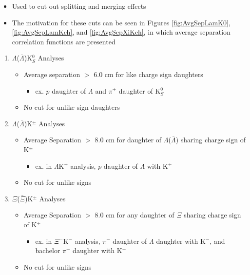 \documentclass[ALICE,manyauthors]{cernphprep}
\begin{document}
\begin{enumerate}
\begin{itemize}
  \item Used to cut out splitting and merging effects
  \item The motivation for these cuts can be seen in Figures \ref{fig:AvgSepLamK0}, \ref{fig:AvgSepLamKch}, and \ref{fig:AvgSepXiKch}, in which average separation correlation functions are presented
 \end{itemize}
 \begin{enumerate}
  \item $\Lambda$($\bar{\Lambda}$)K$^{0}_{S}$ Analyses
  \begin{itemize}
   \item Average separation $>$ 6.0 cm for like charge sign daughters
   \begin{itemize}
    \item ex. $p$ daughter of $\Lambda$ and $\pi^{+}$ daughter of K$^{0}_{S}$
   \end{itemize}
   \item No cut for unlike-sign daughters
  \end{itemize}
  \item $\Lambda$($\bar{\Lambda}$)K$^{\pm}$ Analyses
  \begin{itemize}
   \item Average Separation $>$ 8.0 cm for daughter of $\Lambda$($\bar{\Lambda}$) sharing charge sign of K$^{\pm}$
   \begin{itemize}
    \item ex. in $\Lambda$K$^{+}$ analysis, $p$ daughter of $\Lambda$ with K$^{+}$
   \end{itemize}
   \item No cut for unlike signs
  \end{itemize}
  \item $\Xi$($\bar{\Xi}$)K$^{\pm}$ Analyses
  \begin{itemize}
   \item Average Separation $>$ 8.0 cm for any daughter of $\Xi$ sharing charge sign of K$^{\pm}$
   \begin{itemize}
    \item ex. in $\Xi^{-}$K$^{-}$ analysis, $\pi^{-}$ daughter of $\Lambda$ daughter with K$^{-}$, and bachelor $\pi^{-}$ daughter with K$^{-}$
   \end{itemize}
   \item No cut for unlike signs
  \end{itemize}  
 \end{enumerate}
\end{enumerate}
\end{document}
